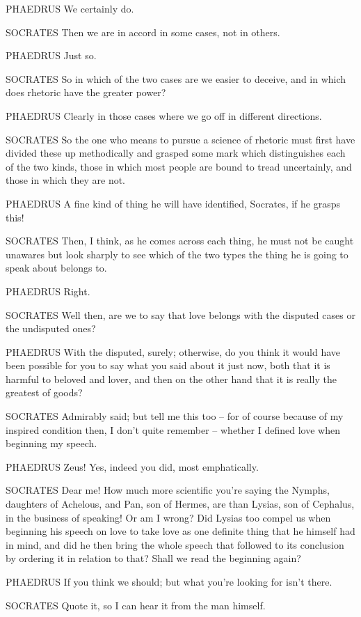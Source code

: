 PHAEDRUS We certainly do.

SOCRATES Then we are in accord in some cases, not in others. 

PHAEDRUS Just so.

SOCRATES So in which of the two cases are we easier to deceive, and in
which does rhetoric have the greater power?

PHAEDRUS Clearly in those cases where we go off in different 
directions.

SOCRATES So the one who means to pursue a science of rhetoric must first
have divided these up methodically and grasped some mark which
distinguishes each of the two kinds, those in which most
people are bound to
tread uncertainly, and those in which they are not.

PHAEDRUS A fine kind of thing he will have identified, Socrates,
 if he grasps this!

SOCRATES Then, I think, as he comes across each thing, he must not be
caught unawares but look sharply to see which of the two types the thing
he is going to speak about belongs to. 

PHAEDRUS Right.

SOCRATES Well then, are we to say that love belongs with the disputed
cases or the undisputed ones?

PHAEDRUS With the disputed, surely; otherwise, do you think it would
have been possible for you to say what you said about  it just
now, both that it is harmful to beloved and lover, and then on the other
hand that it is really the greatest of goods?

SOCRATES Admirably said; but tell me this too -- for of course 
because of my inspired condition then, I don't quite remember -- whether
I defined love when beginning my speech.

PHAEDRUS Zeus! Yes, indeed you did, most emphatically.

SOCRATES Dear me! How much more scientific you're saying  the
Nymphs, daughters of Achelous, and Pan, son of Hermes, are than Lysias,
son of Cephalus, in the business of speaking! Or am I wrong? Did Lysias
too compel us when beginning his speech on love to take love as one
definite thing that he himself  had in mind, and did he then
bring the whole speech that followed to its conclusion by ordering it in
relation to that? Shall we read the beginning again?

PHAEDRUS If you think we should; but what you're looking for isn't
there.

 SOCRATES Quote it, so I can hear it from the man himself.


